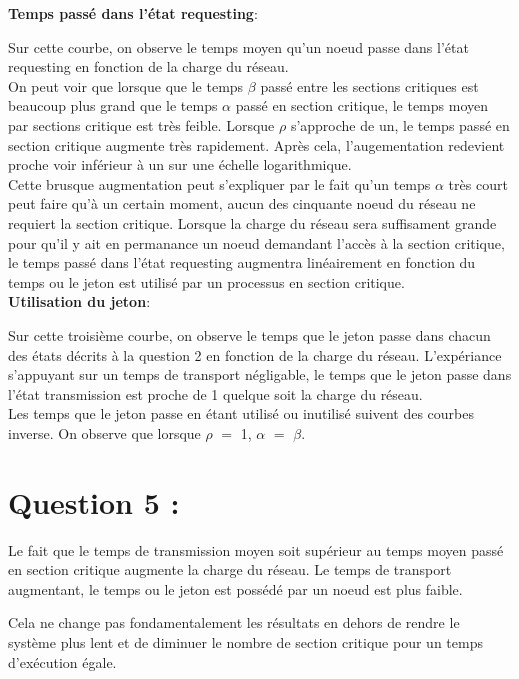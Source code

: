 \documentclass[11pt,a4paper]{report}
\begin{document}
\textbf{Temps passé dans l'état requesting}:

Sur cette courbe, on observe le temps moyen qu'un noeud passe dans l'état requesting en fonction de la charge du réseau.\\

On peut voir que lorsque que le temps $\beta$ passé entre les sections critiques est beaucoup plus grand que le temps $\alpha$ passé en section critique, le temps moyen par sections critique est très feible. Lorsque $\rho$ s'approche de un, le temps passé en section critique augmente très rapidement. Après cela, l'augementation redevient proche voir inférieur à un sur une échelle logarithmique.\\

Cette brusque augmentation peut s'expliquer par le fait qu'un temps $\alpha$ très court peut faire qu'à un certain moment, aucun des cinquante noeud du réseau ne requiert la section critique. Lorsque la charge du réseau sera suffisament grande pour qu'il y ait en permanance un noeud demandant l'accès à la section critique, le temps passé dans l'état requesting augmentra linéairement en fonction du temps ou le jeton est utilisé par un processus en section critique.\\

\textbf{Utilisation du jeton}:

Sur cette troisième courbe, on observe le temps que le jeton passe dans chacun des états décrits à la question 2 en fonction de la charge du réseau. L'expériance s'appuyant sur un temps de transport négligable, le temps que le jeton passe dans l'état transmission est proche de 1 quelque soit la charge du réseau.\\

Les temps que le jeton passe en étant utilisé ou inutilisé suivent des courbes inverse. On observe que lorsque $\rho$ $=$ 1, $\alpha$ $=$ $\beta$.


\section{Question 5 :}

Le fait que le temps de transmission moyen soit supérieur au temps moyen passé en section critique augmente la charge du réseau. Le temps de transport augmentant, le temps ou le jeton est possédé par un noeud est plus faible.

Cela ne change pas fondamentalement les résultats en dehors de rendre le système plus lent et de diminuer le nombre de section critique pour un temps d'exécution égale.
\end{document}
